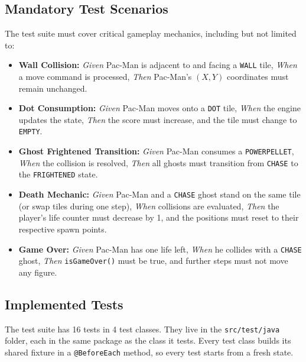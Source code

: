 \documentclass[11pt, a4paper]{article}
\begin{document}
\subsection*{Mandatory Test Scenarios}
The test suite must cover critical gameplay mechanics, including but not limited to:
\begin{itemize}
    \item \textbf{Wall Collision:} \textit{Given} Pac-Man is adjacent to and facing a \texttt{WALL} tile, \textit{When} a move command is processed, \textit{Then} Pac-Man's $(X, Y)$ coordinates must remain unchanged.
    \item \textbf{Dot Consumption:} \textit{Given} Pac-Man moves onto a \texttt{DOT} tile, \textit{When} the engine updates the state, \textit{Then} the score must increase, and the tile must change to \texttt{EMPTY}.
    \item \textbf{Ghost Frightened Transition:} \textit{Given} Pac-Man consumes a \texttt{POWERPELLET}, \textit{When} the collision is resolved, \textit{Then} all ghosts must transition from \texttt{CHASE} to the \texttt{FRIGHTENED} state.
    \item \textbf{Death Mechanic:} \textit{Given} Pac-Man and a \texttt{CHASE} ghost stand on the same tile (or swap tiles during one step), \textit{When} collisions are evaluated, \textit{Then} the player's life counter must decrease by 1, and the positions must reset to their respective spawn points.
    \item \textbf{Game Over:} \textit{Given} Pac-Man has one life left, \textit{When} he collides with a \texttt{CHASE} ghost, \textit{Then} \texttt{isGameOver()} must be true, and further steps must not move any figure.
\end{itemize}

\subsection*{Implemented Tests}
The test suite has 16 tests in 4 test classes. They live in the \texttt{src/test/java} folder, each in the same package as the class it tests. Every test class builds its shared fixture in a \texttt{@BeforeEach} method, so every test starts from a fresh state.
\end{document}
